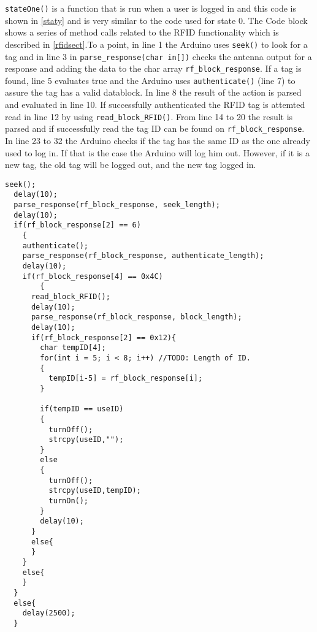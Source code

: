 \verb|stateOne()| is a function that is run when a user is logged in and this code is shown in \autoref{staty} and is very similar to the code used for state 0.
The Code block shows a series of method calls related to the RFID functionality which is described in \autoref{rfidsect}.\newline To a point, in line 1 the Arduino uses \verb|seek()| to look for a tag and in line 3 in \verb|parse_response(char in[])| checks the antenna output for a response and adding the data to the char array \verb|rf_block_response|. 
If a tag is found, line 5 evaluates true and the Arduino uses \verb|authenticate()| (line 7) to assure the tag has a valid datablock.
In line 8 the result of the action is parsed and evaluated in line 10. If successfully authenticated the RFID tag is attemted read in line 12 by using \verb|read_block_RFID()|. From line 14 to 20 the result is parsed and if successfully read the tag ID can be found on \verb|rf_block_response|.\newline
In line 23 to 32 the Arduino checks if the tag has the same ID as the one already used to log in. If that is the case the Arduino will log him out. However, if it is a new tag, the old tag will be logged out, and the new tag logged in.
\begin{lstlisting}[frame=single, label=staty, caption=The Arduino state one code.]
  seek();
  delay(10);
  parse_response(rf_block_response, seek_length);
  delay(10);
  if(rf_block_response[2] == 6)
	{
    authenticate();
    parse_response(rf_block_response, authenticate_length);
    delay(10);
    if(rf_block_response[4] == 0x4C)
		{
      read_block_RFID();
      delay(10);
      parse_response(rf_block_response, block_length);
      delay(10);
      if(rf_block_response[2] == 0x12){
        char tempID[4];
        for(int i = 5; i < 8; i++) //TODO: Length of ID.
        {        
          tempID[i-5] = rf_block_response[i];
        } 
        
        if(tempID == useID)
        {
          turnOff();
          strcpy(useID,"");
        }
        else
        {
          turnOff();
          strcpy(useID,tempID);
          turnOn();
        }
        delay(10);
      }
      else{
      }
    }
    else{
    }
  }
  else{ 
    delay(2500);
  }
\end{lstlisting}